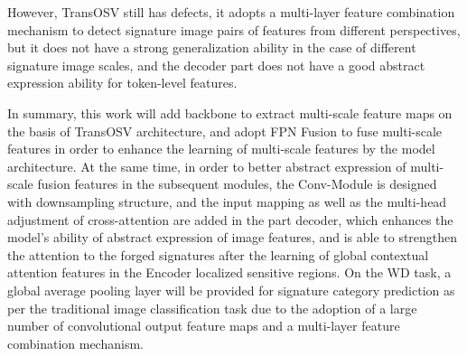 However, TransOSV still has defects, it adopts a multi-layer feature combination mechanism to detect signature image pairs of features from different perspectives, but it does not have a strong generalization ability in the case of different signature image scales, and the decoder part does not have a good abstract expression ability for token-level features.

In summary, this work will add backbone to extract multi-scale feature maps on the basis of TransOSV architecture, and adopt FPN Fusion to fuse multi-scale features in order to enhance the learning of multi-scale features by the model architecture. At the same time, in order to better abstract expression of multi-scale fusion features in the subsequent modules, the Conv-Module is designed with downsampling structure, and the input mapping as well as the multi-head adjustment of cross-attention are added in the part decoder, which enhances the model's ability of abstract expression of image features, and is able to strengthen the attention to the forged signatures after the learning of global contextual attention features in the Encoder localized sensitive regions. On the WD task, a global average pooling layer \cite{22} will be provided for signature category prediction as per the traditional image classification task due to the adoption of a large number of convolutional output feature maps and a multi-layer feature combination mechanism.
